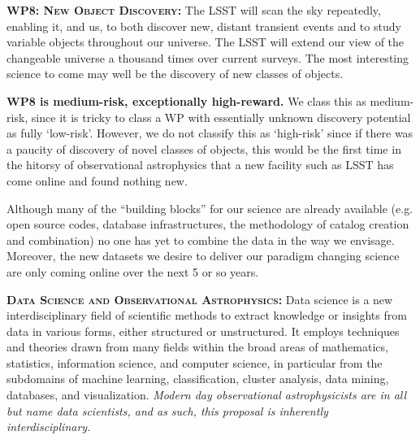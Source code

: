 \documentclass[oneside, a4paper, onecolumn, 11pt]{article}
\begin{document}
\smallskip
\smallskip
\noindent
\textbf{\textsc{WP8: New Object Discovery:}} 
The LSST will scan the sky repeatedly, enabling it, and us, to both
discover new, distant transient events and to study variable objects
throughout our universe. The LSST will extend our view of the
changeable universe a thousand times over current surveys.  The most
interesting science to come may well be the discovery of new classes
of objects.

\noindent
{\bf WP8 is medium-risk, exceptionally high-reward.}
We class this as medium-risk, since it is tricky to class a WP with essentially unknown discovery potential as fully `low-risk'. However, we do not classify this as `high-risk' since if there was a paucity of discovery of novel classes of objects, this would be the first time in the hitorsy of observational astrophysics that a new facility such as LSST has come online and found nothing new. 


\smallskip
\smallskip
\noindent
Although many of the ``building blocks'' for our science are already
available (e.g. open source codes, database infrastructures, the
methodology of catalog creation and combination) no one has yet to
combine the data in the way we envisage. Moreover, the new datasets we
desire to deliver our paradigm changing science are only coming online
over the next 5 or so years.


\smallskip
\smallskip
\noindent
\textbf{\textsc{{Data Science and Observational Astrophysics:}}}
Data science is a new interdisciplinary field of scientific methods to
extract knowledge or insights from data in various forms, either
structured or unstructured. It employs techniques and theories drawn
from many fields within the broad areas of mathematics, statistics,
information science, and computer science, in particular from the
subdomains of machine learning, classification, cluster analysis, data
mining, databases, and visualization.  {\it Modern day observational
astrophysicists are in all but name data scientists, and as such, this
proposal is inherently interdisciplinary.}
\end{document}
